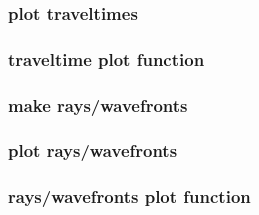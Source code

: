 \begin{frame} \frametitle{plot traveltimes}
\end{frame}
\cwpnote{}

\begin{frame} \frametitle{traveltime plot function}
\end{frame}
\cwpnote{}

\begin{frame}
\end{frame}
\cwpnote{}


\begin{frame} \frametitle{make rays/wavefronts}
\end{frame}
\cwpnote{}

\begin{frame} \frametitle{plot rays/wavefronts}
\end{frame}
\cwpnote{}

\begin{frame} \frametitle{rays/wavefronts plot function}
\end{frame}
\cwpnote{}

\begin{frame}
\end{frame}
\cwpnote{}

\begin{frame}

  
  \vfill


  \vfill
  
  \begin{center}
  \end{center}
  
\end{frame}
\cwpnote{}
